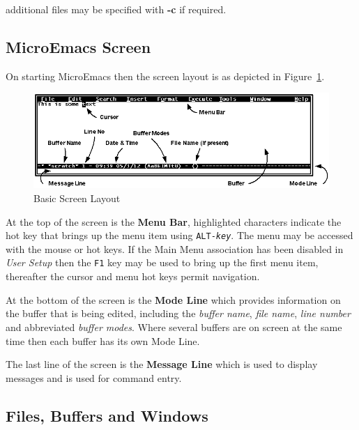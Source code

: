 \documentclass[11pt,a4paper,pdftex]{article}
\begin{document}
  
  additional files may be specified with \textbf{-c} if required.

\subsection{MicroEmacs Screen}

  On starting MicroEmacs then the screen layout is as depicted in
  Figure~\ref{fig:basicscreen}.

  \begin{figure}[!hbt]
    \begin{center}
      \includegraphics[keepaspectratio,width=5in]{basicscreenannot}
      \caption{Basic Screen Layout}
      \label{fig:basicscreen}
    \end{center}
  \end{figure}

  At the top of the screen is the \textbf{Menu Bar}, highlighted characters
  indicate the hot key that brings up the menu item using
  \texttt{ALT-\textit{key}}. The menu may be accessed with the mouse or hot
  keys. If the Main Menu association has been disabled in \textit{User Setup}
  then the \texttt{F1} key may be used to bring up the first menu item,
  thereafter the cursor and menu hot keys permit navigation.

  At the bottom of the screen is the \textbf{Mode Line} which provides
  information on the buffer that is being edited, including the \textit{buffer
  name}, \textit{file name}, \textit{line number} and abbreviated
  \textit{buffer modes}. Where several buffers are on screen at the same time
  then each buffer has its own Mode Line.

  The last line of the screen is the \textbf{Message Line} which is used to
  display messages and is used for command entry.

\subsection{Files, Buffers and Windows}
\end{document}
